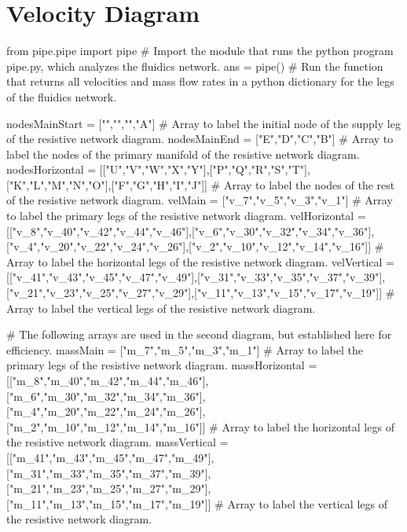 \documentclass[12pt, oneside]{article}   	%
\begin{document}
\section{Velocity Diagram}

\hspace*{-1.3in} %
\begin{circuitikz}[font=\tiny] %

\def\hspc{3.2} %
\def\vspc{4} %

\begin{pycode}
from pipe.pipe import pipe # Import the module that runs the python program pipe.py, which analyzes the fluidics network.
ans = pipe() # Run the function that returns all velocities and mass flow rates in a python dictionary for the legs of the fluidics network.

nodesMainStart = ["","","","A"] # Array to label the initial node of the supply leg of the resistive network diagram.
nodesMainEnd = ["E","D","C","B"] # Array to label the nodes of the primary manifold of the resistive network diagram.
nodesHorizontal = [["U","V","W","X","Y"],["P","Q","R","S","T"],["K","L","M","N","O"],["F","G","H","I","J"]] # Array to label the nodes of the rest of the resistive network diagram.
velMain = ["v_7","v_5","v_3","v_1"] # Array to label the primary legs of the resistive network diagram.
velHorizontal = [["v_8","v_40","v_42","v_44","v_46"],["v_6","v_30","v_32","v_34","v_36"],["v_4","v_20","v_22","v_24","v_26"],["v_2","v_10","v_12","v_14","v_16"]] # Array to label the horizontal legs of the resistive network diagram.
velVertical = [["v_41","v_43","v_45","v_47","v_49"],["v_31","v_33","v_35","v_37","v_39"],["v_21","v_23","v_25","v_27","v_29"],["v_11","v_13","v_15","v_17","v_19"]] # Array to label the vertical legs of the resistive network diagram.

# The following arrays are used in the second diagram, but established here for efficiency.
massMain = ["m_7","m_5","m_3","m_1"]  # Array to label the primary legs of the resistive network diagram.
massHorizontal = [["m_8","m_40","m_42","m_44","m_46"],["m_6","m_30","m_32","m_34","m_36"],["m_4","m_20","m_22","m_24","m_26"],["m_2","m_10","m_12","m_14","m_16"]] # Array to label the horizontal legs of the resistive network diagram.
massVertical = [["m_41","m_43","m_45","m_47","m_49"],["m_31","m_33","m_35","m_37","m_39"],["m_21","m_23","m_25","m_27","m_29"],["m_11","m_13","m_15","m_17","m_19"]] # Array to label the vertical legs of the resistive network diagram.


\end{pycode}
\end{circuitikz}
\end{document}
